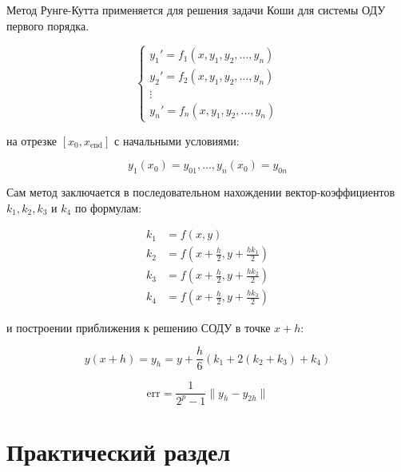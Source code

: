 \documentclass[14pt, russian]{scrartcl}
\begin{document}
Метод Рунге-Кутта применяется для решения задачи Коши для системы ОДУ первого
порядка.

\[
\begin{cases}
y_1' = f_1(x, y_1, y_2, \ldots, y_n) \\
y_2' = f_2(x, y_1, y_2, \ldots, y_n) \\
\vdots \\
y_n' = f_n(x, y_1, y_2, \ldots, y_n)
\end{cases}
\]

на отрезке \([x_0, x_{\text{end}}]\) с начальными условиями:

\[ y_1(x_0) = y_{01}, \ldots, y_n(x_0) = y_{0n} \]

Сам метод заключается в последовательном нахождении вектор-коэффициентов
\(k_1, k_2, k_3\) и \(k_4\) по формулам:

\[
\begin{aligned}
k_1 &= f(x, y) \\
k_2 &= f\left(x + \frac{h}{2}, y + \frac{hk_1}{2}\right) \\
k_3 &= f\left(x + \frac{h}{2}, y + \frac{hk_2}{2}\right) \\
k_4 &= f\left(x + \frac{h}{2}, y + \frac{hk_3}{2}\right)
\end{aligned}
\]

и построении приближения к решению СОДУ в точке \(x + h\):

\[ y(x + h) = y_h = y + \frac{h}{6}(k_1 + 2(k_2 + k_3) + k_4) \]

\[ \text{err} = \frac{1}{2^p - 1}\|y_h - y_{2h}\| \]

\section{Практический раздел}
\end{document}
